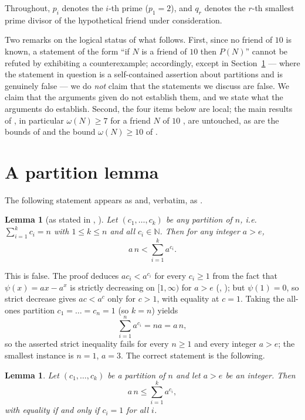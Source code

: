 \documentclass[11pt,a4paper]{article}
\theoremstyle{plain}
\newtheorem{lemma}[theorem]{Lemma}
\theoremstyle{definition}
\newcommand{\NN}{\mathbb{N}}
\begin{document}
Throughout, $p_{i}$ denotes the $i$-th prime ($p_{1}=2$), and $q_{r}$ denotes the
$r$-th smallest prime divisor of the hypothetical friend under consideration.

Two remarks on the logical status of what follows. First, since no friend of $10$ is
known, a statement of the form ``if $N$ is a friend of $10$ then $P(N)$'' cannot be
refuted by exhibiting a counterexample; accordingly, except in
Section~\ref{sec:partition} --- where the statement in question is a self-contained
assertion about partitions and is genuinely false --- we do \emph{not} claim that the
statements we discuss are false. We claim that the arguments given do not establish
them, and we state what the arguments do establish. Second, the four items below are
local; the main results of \cite{CMM10,CMM20,M10}, in particular $\omega(N)\ge 7$
for a friend $N$ of $10$ \cite[Theorem 1.2]{CMM10}, are untouched, as are the bounds
of \cite{MM} and the bound $\omega(N)\ge 10$ of \cite{Thackeray}.

\section{A partition lemma}\label{sec:partition}

The following statement appears as \cite[Lemma 2.3]{CMM10} and, verbatim, as
\cite[Lemma 23]{CMM20}.

\begin{lemma}[as stated in {\cite[Lemma 2.3]{CMM10}}, {\cite[Lemma 23]{CMM20}}]
\label{lem:orig}
Let $(c_{1},\dots,c_{k})$ be any partition of $n$, i.e.\ $\sum_{i=1}^{k}c_{i}=n$ with
$1\le k\le n$ and all $c_{i}\in\NN$. Then for any integer $a>e$,
\[
  a\,n<\sum_{i=1}^{k}a^{c_{i}}.
\]
\end{lemma}

This is false. The proof deduces $ac_{i}<a^{c_{i}}$ for every $c_{i}\ge 1$ from the
fact that $\psi(x)=ax-a^{x}$ is strictly decreasing on $[1,\infty)$ for $a>e$
(\cite[Lemma 2.2]{CMM10}, \cite[Lemma 22]{CMM20}); but $\psi(1)=0$, so strict
decrease gives $ac<a^{c}$ only for $c>1$, with equality at $c=1$. Taking the all-ones
partition $c_{1}=\dots=c_{n}=1$ (so $k=n$) yields
\[
  \sum_{i=1}^{n}a^{c_{i}}=na=a\,n ,
\]
so the asserted strict inequality fails for every $n\ge 1$ and every integer $a>e$;
the smallest instance is $n=1$, $a=3$. The correct statement is the following.

\begin{lemma}\label{lem:fix}
Let $(c_{1},\dots,c_{k})$ be a partition of $n$ and let $a>e$ be an integer. Then
\[
  a\,n\le\sum_{i=1}^{k}a^{c_{i}},
\]
with equality if and only if $c_{i}=1$ for all $i$.
\end{lemma}
\end{document}
